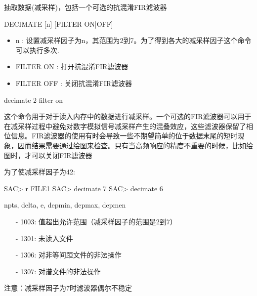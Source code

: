 \label{cmd:decimate}

抽取数据(减采样)，包括一个可选的抗混淆FIR滤波器

\begin{SACSTX}
DECIMATE [n] [FILTER ON|OFF]
\end{SACSTX}

\begin{itemize}
\item n : 设置减采样因子为n，其范围为2到7。为了得到各大的减采样因子这个命令可以执行多次.
\item FILTER ON : 打开抗混淆FIR滤波器
\item FILTER OFF : 关闭抗混淆FIR滤波器
\end{itemize}

\begin{SACDFT}
decimate 2 filter on
\end{SACDFT}

这个命令用于对于读入内存中的数据进行减采样。一个可选的FIR滤波器可以用于在减采样过程中避免对数字模拟信号减采样产生的混叠效应，这些滤波器保留了相位信息。FIR滤波器的使用有时会导致一些不期望简单的位于数据末尾的短时现象，因而结果需要通过绘图来检查。只有当高频响应的精度不重要的时候，比如绘图时，才可以关闭FIR滤波器

为了使减采样因子为42:
\begin{SACCode}
SAC> r FILE1
SAC> decimate 7
SAC> decimate 6
\end{SACCode}

npts, delta, e, depmin, depmax, depmen

\begin{itemize}
\item[-]1003: 值超出允许范围（减采样因子的范围是2到7）
\item[-]1301: 未读入文件
\item[-]1306: 对非等间距文件的非法操作
\item[-]1307: 对谱文件的非法操作
\end{itemize}

注意：减采样因子为7时滤波器偶尔不稳定

